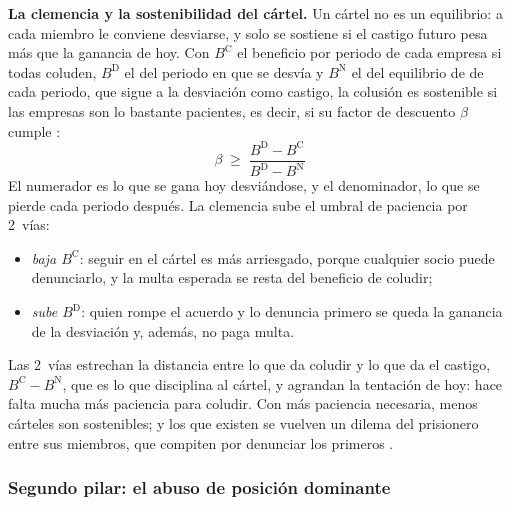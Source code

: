 \documentclass[11pt]{article}
\begin{document}
\begin{anotaciones}
\textbf{La clemencia y la sostenibilidad del cártel.} Un cártel no es un equilibrio: a cada miembro le conviene desviarse, y solo se sostiene si el castigo futuro pesa más que la ganancia de hoy. Con $B^{\mathrm C}$ el beneficio por periodo de cada empresa si todas coluden, $B^{\mathrm D}$ el del periodo en que se desvía y $B^{\mathrm N}$ el del equilibrio de  de cada periodo, que sigue a la desviación como castigo, la colusión es sostenible si las empresas son lo bastante pacientes, es decir, si su factor de descuento $\beta$ cumple :
\begin{equation}\label{eq:colusion-clemencia}
\beta\;\geq\;\frac{B^{\mathrm D}-B^{\mathrm C}}{B^{\mathrm D}-B^{\mathrm N}}
\end{equation}
El numerador es lo que se gana hoy desviándose, y el denominador, lo que se pierde cada periodo después. La clemencia sube el umbral de paciencia por 2~vías:
\begin{itemize}
\item \emph{baja $B^{\mathrm C}$}: seguir en el cártel es más arriesgado, porque cualquier socio puede denunciarlo, y la multa esperada se resta del beneficio de coludir;
\item \emph{sube $B^{\mathrm D}$}: quien rompe el acuerdo y lo denuncia primero se queda la ganancia de la desviación y, además, no paga multa.
\end{itemize}
Las 2~vías estrechan la distancia entre lo que da coludir y lo que da el castigo, $B^{\mathrm C}-B^{\mathrm N}$, que es lo que disciplina al cártel, y agrandan la tentación de hoy: hace falta mucha más paciencia para coludir. Con más paciencia necesaria, menos cárteles son sostenibles; y los que existen se vuelven un dilema del prisionero entre sus miembros, que compiten por denunciar los primeros \parencite{MottaPolo2003Leniency} .
\end{anotaciones}

\subsubsection{Segundo pilar: el abuso de posición dominante}\label{sec:abuso}
\end{document}
